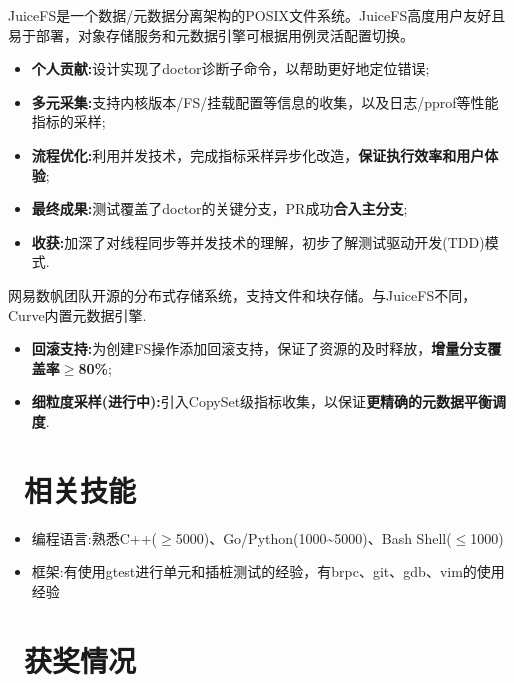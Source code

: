 \documentclass{resume}
\begin{document}
JuiceFS是一个数据/元数据分离架构的POSIX文件系统。JuiceFS高度用户友好且易于部署，对象存储服务和元数据引擎可根据用例灵活配置切换。
\begin{itemize}[parsep=0.3ex]
  \item \textbf{个人贡献:}设计实现了doctor诊断子命令，以帮助更好地定位错误;
  \item \textbf{多元采集:}支持内核版本/FS/挂载配置等信息的收集，以及日志/pprof等性能指标的采样;
  \item \textbf{流程优化:}利用并发技术，完成指标采样异步化改造，\textbf{保证执行效率和用户体验};
  \item \textbf{最终成果:}测试覆盖了doctor的关键分支，PR成功\textbf{合入主分支};\enspace{}
  \item \textbf{收获:}加深了对线程同步等并发技术的理解，初步了解测试驱动开发(TDD)模式.
\end{itemize}
网易数帆团队开源的分布式存储系统，支持文件和块存储。与JuiceFS不同，Curve内置元数据引擎.
\begin{itemize}[parsep=0.3ex]
  \item \textbf{回滚支持:}为创建FS操作添加回滚支持，保证了资源的及时释放，\textbf{增量分支覆盖率$\geq$80\%};\enspace{}
  \item \textbf{细粒度采样(进行中):}引入CopySet级指标收集，以保证\textbf{更精确的元数据平衡调度}.
\end{itemize}
\section{\faCogs\ 相关技能}
\begin{itemize}[parsep=0.5ex]
  \item 编程语言:熟悉C++($\geq${5000})、Go/Python(1000\textasciitilde5000)、Bash Shell($\leq$1000)
  \item 框架:有使用gtest进行单元和插桩测试的经验，有brpc、git、gdb、vim的使用经验
\end{itemize}
\section{\faHeartO\ 获奖情况}
\end{document}
